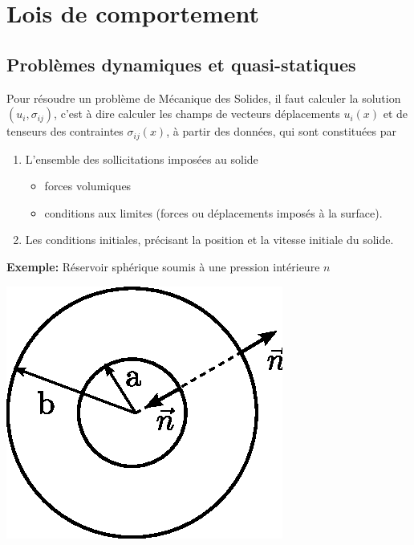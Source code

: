 \chapter{Lois de comportement}
\section{Problèmes dynamiques et quasi-statiques}
Pour résoudre un problème de Mécanique des Solides, il faut calculer la solution $(u_i, \sigma_{ij})$, c'est à dire calculer les champs de vecteurs déplacements $u_i(x)$ et de tenseurs des contraintes $\sigma_{ij}(x)$, à partir des données, qui sont constituées par
\begin{enumerate}
    \item L'ensemble des sollicitations imposées au solide
        \begin{itemize}
            \item forces volumiques
            \item conditions aux limites (forces ou déplacements imposés à la surface).
        \end{itemize}
    \item Les conditions initiales, précisant la position et la vitesse initiale du solide.
\end{enumerate}
\textbf{Exemple:} Réservoir sphérique soumis à une pression intérieure $n$
\begin{center}
    \includegraphics{../images/T1_Ch04-0001}
\end{center}
